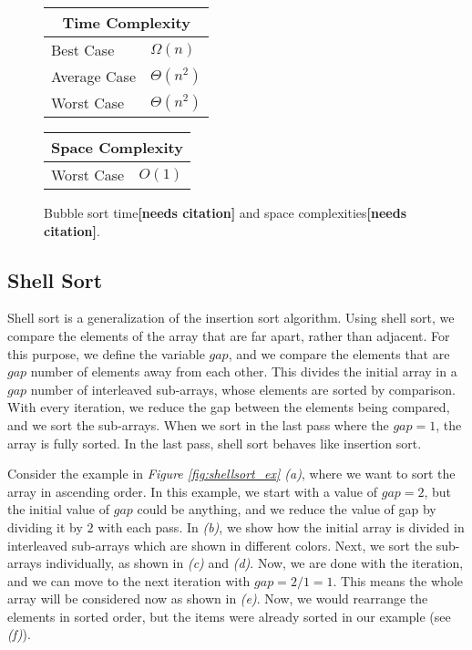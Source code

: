 \begin{figure}[!ht]
    \centering
    \begin{tabular}{l|l}
    \multicolumn{2}{c}{\textbf{Time Complexity}} \\
    \hline
    Best Case    & $\Omega(n)$ \\
    Average Case & $\Theta(n^2)$ \\
    Worst Case   & $\Theta(n^2)$ \\
    \end{tabular}
    \quad\quad
    \begin{tabular}{l|l}
    \multicolumn{2}{c}{\textbf{Space Complexity}} \\
    \hline
    Worst Case   & $O(1)$
    \end{tabular}
    
    \caption{Bubble sort time\textbf{[needs citation]} and space complexities\textbf{[needs citation]}.}
    \label{fig:bubblesort}
\end{figure}


\subsection{Shell Sort}

Shell sort is a generalization of the insertion sort algorithm. Using shell sort, we compare the elements of the array that are far apart, rather than adjacent. For this purpose, we define the variable $gap$, and we compare the elements that are $gap$ number of elements away from each other. This divides the initial array in a $gap$ number of interleaved sub-arrays, whose elements are sorted by comparison. With every iteration, we reduce the gap between the elements being compared, and we sort the sub-arrays. When we sort in the last pass where the $gap = 1$, the array is fully sorted. In the last pass, shell sort behaves like insertion sort.

Consider the example in \textit{Figure \ref{fig:shellsort_ex} (a)}, where we want to sort the array in ascending order. In this example, we start with a value of $gap = 2$, but the initial value of $gap$ could be anything, and we reduce the value of gap by dividing it by $2$ with each pass. In \textit{(b)}, we show how the initial array is divided in interleaved sub-arrays which are shown in different colors. Next, we sort the sub-arrays individually, as shown in \textit{(c)} and \textit{(d)}. Now, we are done with the iteration, and we can move to the next iteration with $gap = 2/1 = 1$. This means the whole array will be considered now as shown in \textit{(e)}. Now, we would rearrange the elements in sorted order, but the items were already sorted in our example (see \textit{(f)}).

